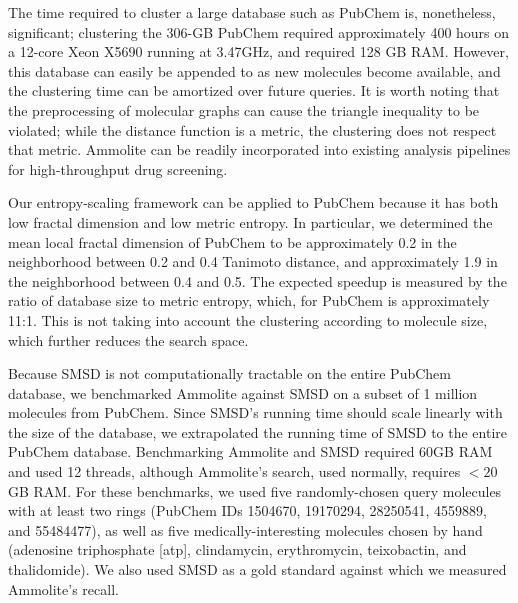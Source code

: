 \documentclass[review,preprint,12pt]{elsarticle}
\theoremstyle{definition}
\theoremstyle{remark}
\numberwithin{equation}{section}
\begin{document}
The time required to cluster a large database such as PubChem is, nonetheless, significant; clustering the 306-GB PubChem required approximately 400 hours on a
12-core Xeon X5690 running at 3.47GHz, and required 128 GB RAM.
However, this database can easily be appended to as new molecules become available, and the clustering time can be amortized over future queries.
It is worth noting that the preprocessing of molecular graphs can cause the 
triangle inequality to be violated; while the distance function is a metric, the
clustering does not respect that metric.
Ammolite can be readily incorporated into existing analysis pipelines for 
high-throughput drug screening.

Our entropy-scaling framework can be applied to PubChem because it has both low fractal
dimension and low metric entropy.
In particular, we determined the mean local fractal dimension of PubChem to be 
approximately 0.2 in the neighborhood between 0.2 and 0.4 Tanimoto distance,
and approximately 1.9 in the neighborhood between 0.4 and 0.5.
The expected speedup is measured by the ratio of database size to metric entropy, which, for PubChem is approximately 11:1.
This is not taking into account the clustering according to molecule size, which
further reduces the search space.

Because SMSD is not computationally tractable on the entire PubChem database,
we benchmarked Ammolite against SMSD on a subset of 1 million molecules from PubChem.
Since SMSD's running time should scale linearly with the size of the database, we extrapolated the
running time of SMSD to the entire PubChem database.
Benchmarking Ammolite and SMSD required 60GB RAM and used 12 threads, although
Ammolite's search, used normally, requires $< 20$ GB RAM.
For these benchmarks, we used five randomly-chosen query molecules with at least two rings (PubChem IDs 1504670, 19170294, 28250541, 4559889, and 55484477), as well as five medically-interesting molecules chosen by hand (adenosine triphosphate [atp], clindamycin, erythromycin, teixobactin, and thalidomide).
We also used SMSD as a gold standard against which we measured Ammolite's recall.
\end{document}
